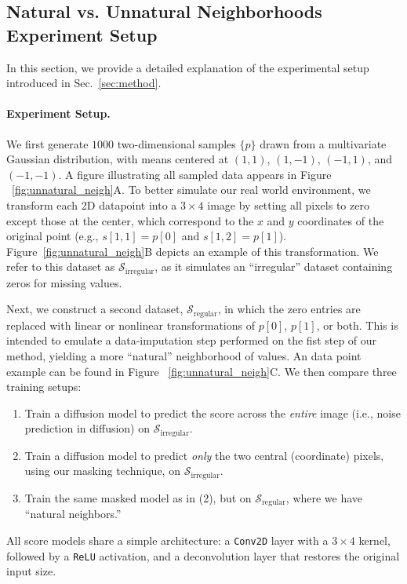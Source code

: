 \documentclass{article}
\theoremstyle{plain}
\theoremstyle{definition}
\theoremstyle{remark}
\begin{document}
{\clearpage

\subsection{Natural vs. Unnatural Neighborhoods Experiment Setup}
\label{sec:natural_vs_unnatural}

In this section, we provide a detailed explanation of the experimental setup introduced in Sec.~\ref{sec:method}.

\paragraph{Experiment Setup.}
We first generate $1000$ two-dimensional samples $\{p\}$ drawn from a multivariate Gaussian distribution, with means centered at $(1,1)$, $(1,-1)$, $(-1,1)$, and $(-1,-1)$. A figure illustrating all sampled data appears in Figure ~\ref{fig:unnatural_neigh}A. To better simulate our real world environment, we transform each 2D datapoint into a $3 \times 4$ image by setting all pixels to zero except those at the center, which correspond to the $x$ and $y$ coordinates of the original point (e.g., $s[1,1] = p[0]$ and $s[1,2] = p[1]$). Figure~\ref{fig:unnatural_neigh}B depicts an example of this transformation. We refer to this dataset as $\mathcal{S}_{\mathrm{irregular}}$, as it simulates an ``irregular'' dataset containing zeros for missing values.


Next, we construct a second dataset, $\mathcal{S}_{\mathrm{regular}}$, in which the zero entries are replaced with linear or nonlinear transformations of $p[0]$, $p[1]$, or both. This is intended to emulate a data-imputation step performed on the fist step of our method, yielding a more ``natural'' neighborhood of values. An data point example can be found in Figure ~\ref{fig:unnatural_neigh}C.
We then compare three training setups:
\begin{enumerate}
    \item Train a diffusion model to predict the score across the \emph{entire} image (i.e., noise prediction in diffusion) on $\mathcal{S}_{\mathrm{irregular}}$.
    \item Train a diffusion model to predict \emph{only} the two central (coordinate) pixels, using our masking technique, on $\mathcal{S}_{\mathrm{irregular}}$.
    \item Train the same masked model as in (2), but on $\mathcal{S}_{\mathrm{regular}}$, where we have ``natural neighbors.''
\end{enumerate}
All score models share a simple architecture: a \texttt{Conv2D} layer with a $3\times 4$ kernel, followed by a \texttt{ReLU} activation, and a deconvolution layer that restores the original input size.

}
\end{document}
